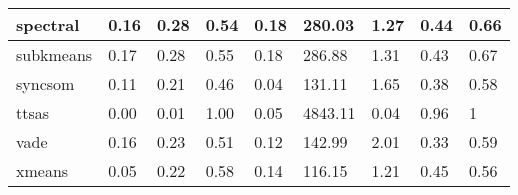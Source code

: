 \begin{table}[H]
\begin{tabular}{|l|l|l|l|l|l|l|l|l|}
\hline
spectral & 0.16 & 0.28 & 0.54 & 0.18 & 280.03 & 1.27 & 0.44 & 0.66 \\
\hline
subkmeans & 0.17 & 0.28 & 0.55 & 0.18 & 286.88 & 1.31 & 0.43 & 0.67 \\
\hline
syncsom & 0.11 & 0.21 & 0.46 & 0.04 & 131.11 & 1.65 & 0.38 & 0.58 \\
\hline
ttsas & 0.00 & 0.01 & 1.00 & 0.05 & 4843.11 & 0.04 & 0.96 & 1 \\
\hline
vade & 0.16 & 0.23 & 0.51 & 0.12 & 142.99 & 2.01 & 0.33 & 0.59 \\
\hline
xmeans & 0.05 & 0.22 & 0.58 & 0.14 & 116.15 & 1.21 & 0.45 & 0.56 \\
\hline
\end{tabular}
\end{table}



